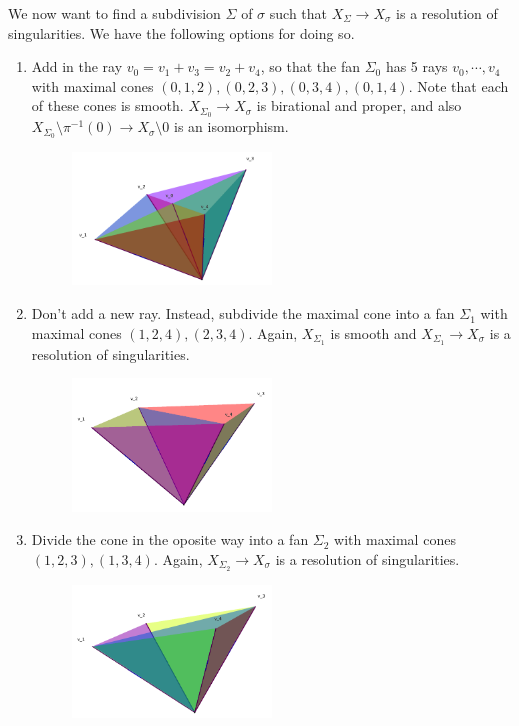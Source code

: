 \documentclass[a4paper,12pt]{amsart}
\begin{document}
We now want to find a subdivision $\Sigma$ of $\sigma$ such that $X_{\Sigma}\rightarrow X_\sigma$ is a resolution of singularities. We have the following options for doing so.
\begin{enumerate}
	\item  Add in the ray $v_0=v_1+v_3=v_2+v_4$, so that the fan $\Sigma_0$ has 5 rays $v_0,\cdots,v_4$ with maximal cones $(0,1,2),(0,2,3),(0,3,4),(0,1,4)$.
	Note that each of these cones is smooth. $X_{\Sigma_0}\rightarrow X_\sigma$ is birational and proper, and also $X_{\Sigma_0}\setminus\pi^{-1}(0)\rightarrow X_\sigma\setminus0$ is an isomorphism.
	
	\begin{figure}[h]
		\centering
		\includegraphics[width=0.5\textwidth]{pic/Mar19_fan1}
	\end{figure}
	
	\item Don't add a new ray. Instead, subdivide the maximal cone into a fan $\Sigma_1$ with maximal cones $(1,2,4),(2,3,4)$. Again, $X_{\Sigma_1}$ is smooth and $X_{\Sigma_1}\rightarrow X_\sigma$ is a resolution of singularities.
	
	\begin{figure}[h]
		\centering
		\includegraphics[width=0.5\textwidth]{pic/Mar19_fan2}
	\end{figure}
	\vspace{3cm}
	
	\item Divide the cone in the oposite way into a fan $\Sigma_2$ with maximal cones $(1,2,3),(1,3,4)$. Again, $X_{\Sigma_2}\rightarrow X_\sigma$ is a resolution of singularities.
	
	\begin{figure}[h]
		\centering
		\includegraphics[width=0.5\textwidth]{pic/Mar19_fan3}
	\end{figure}
\end{enumerate}
\end{document}

